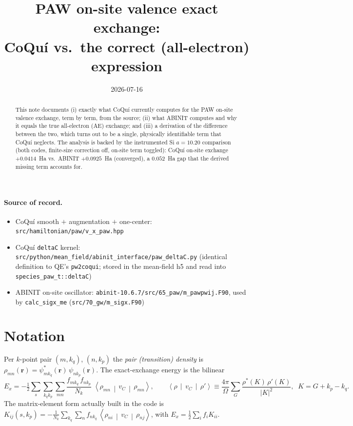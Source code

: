 \documentclass[11pt]{article}
\title{\bfseries PAW on-site valence exact exchange:\\
CoQu\'i vs.\ the correct (all-electron) expression}
\author{}
\date{2026-07-16}
\newcommand{\vc}{v_C}
\newcommand{\avg}[3]{\left\langle #1 \,\middle|\, #2 \,\middle|\, #3 \right\rangle}
\newcommand{\code}[1]{\texttt{\small #1}}
\begin{document}
\maketitle

\begin{abstract}
\noindent
This note documents (i) exactly what CoQu\'i currently computes for the PAW
on-site valence exchange, term by term, from the source; (ii) what ABINIT
computes and why it equals the true all-electron (AE) exchange; and (iii) a
derivation of the difference between the two, which turns out to be a single,
physically identifiable term that CoQu\'i neglects. The analysis is backed by the
instrumented Si $a=10.20$ comparison (both codes, finite-size correction off,
on-site term toggled): CoQu\'i on-site exchange $+0.0414$~Ha vs.\ ABINIT
$+0.0925$~Ha (converged), a $0.052$~Ha gap that the derived missing term
accounts for.
\end{abstract}

\paragraph{Source of record.}
\begin{itemize}[nosep,leftmargin=1.4em]
  \item CoQu\'i smooth $+$ augmentation $+$ one-center: \code{src/hamiltonian/paw/v\_x\_paw.hpp}
  \item CoQu\'i \code{deltaC} kernel: \code{src/python/mean\_field/abinit\_interface/paw\_deltaC.py}
        (identical definition to QE's \code{pw2coqui}; stored in the mean-field h5
        and read into \code{species\_paw\_t::deltaC})
  \item ABINIT on-site oscillator: \code{abinit-10.6.7/src/65\_paw/m\_pawpwij.F90},
        used by \code{calc\_sigx\_me} (\code{src/70\_gw/m\_sigx.F90})
\end{itemize}

\section{Notation}

Per $k$-point pair $(m,k_q)$, $(n,k_p)$ the \emph{pair (transition) density} is
$\rho_{mn}(\mathbf r) = \psi^{*}_{m k_q}(\mathbf r)\,\psi_{n k_p}(\mathbf r)$.
The exact-exchange energy is the bilinear
\begin{equation}
E_x = -\tfrac12 \sum_{s}\sum_{k_q k_p}\sum_{mn}
      \frac{f_{m k_q}\, f_{n k_p}}{N_k}\;
      \avg{\rho_{mn}}{\vc}{\rho_{mn}},
\qquad
\avg{\rho}{\vc}{\rho'} \equiv \frac{4\pi}{\Omega}\sum_{G}\frac{\rho^{*}(K)\,\rho'(K)}{|K|^2},
\;\; K = G + k_p - k_q .
\end{equation}
The matrix-element form actually built in the code is
$K_{ij}(s,k_p) = -\frac{1}{N_k}\sum_{k_q}\sum_n f_{n k_q}\,\avg{\rho_{ni}}{\vc}{\rho_{nj}}$,
with $E_x = \tfrac12\sum_i f_i K_{ii}$.
\end{document}
